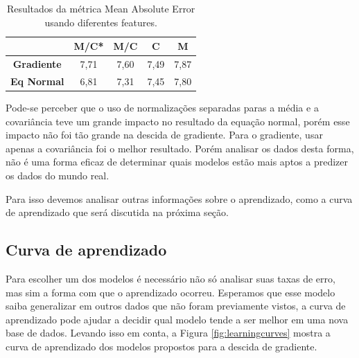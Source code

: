\documentclass[conference]{IEEEtran}
\begin{document}
\begin{table}[!h]
	\centering
	
	\begin{tabular}{ccccc} \hline
		\backslashbox{\textbf{Modelos}}{\textbf{Features}}  & \textbf{M/C*} & \textbf{M/C} & \textbf{C} & \textbf{M} \\ \hline
		\textbf{Gradiente} & 7,71          & 7,60         & 7,49       & 7,87       \\
		\textbf{Eq Normal} & 6,81          & 7,31         & 7,45       & 7,80      
	\end{tabular}
	
	\caption{Resultados da métrica Mean Absolute Error usando diferentes features.}
	\label{tab:feat}
\end{table}


Pode-se perceber que o uso de normalizações separadas paras a média e a covariância teve um grande impacto no resultado da equação normal, porém esse impacto não foi tão grande na descida de gradiente. Para o gradiente, usar apenas a covariância foi o melhor resultado. Porém analisar os dados desta forma, não é uma forma eficaz de determinar quais modelos estão mais aptos a predizer os dados do mundo real.

Para isso devemos analisar outras informações sobre o aprendizado, como a curva de aprendizado que será discutida na próxima seção.

\subsection{Curva de aprendizado}

Para escolher um dos modelos é necessário não só analisar suas taxas de erro, mas sim a forma com que o aprendizado ocorreu. Esperamos que esse modelo saiba generalizar em outros dados que não foram previamente vistos, a curva de aprendizado pode ajudar a decidir qual modelo tende a ser melhor em uma nova base de dados. Levando isso em conta, a Figura \ref{fig:learningcurves} mostra a curva de aprendizado dos modelos propostos para a descida de gradiente.
\end{document}
